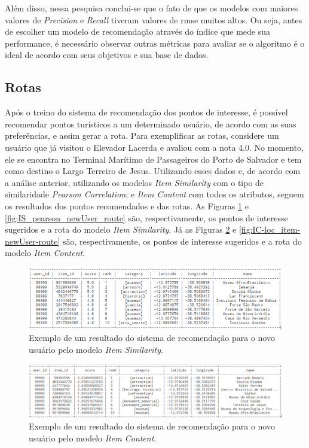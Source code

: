 Além disso, nessa pesquisa conclui-se que o fato de que os modelos com maiores valores de \textit{Precision} e \textit{Recall} tiveram valores de \ac{rmse} muitos altos. Ou seja, antes de escolher um modelo de recomendação através do índice que mede sua performance, é necessário observar outras métricas para avaliar se o algoritmo é o ideal de acordo com seus objetivos e sua base de dados.

\subsection{Rotas}

Após o treino do sistema de recomendação dos pontos de interesse, é possível recomendar pontos turísticos a um determinado usuário, de acordo com as suas preferências, e assim gerar a rota. Para exemplificar as rotas, considere um usuário que já visitou o Elevador Lacerda e avaliou com a nota 4.0. No momento, ele se encontra no Terminal Marítimo de Passageiros do Porto de Salvador e tem como destino o Largo Terreiro de Jesus. Utilizando esses dados e, de acordo com a análise anterior, utilizando os modelos \textit{Item Similarity} com o tipo de similaridade \textit{Pearson Correlation}; e \textit{Item Content} com todos os atributos, seguem os resultados dos pontos recomendados e das rotas. As Figuras \ref{fig:IS_pearson_newUser_results_rotate} e \ref{fig:IS_pearson_newUser_route} são, respectivamente, os pontos de interesse sugeridos e a rota do modelo \textit{Item Similarity}. Já as Figuras \ref{fig:IC-loc_item-newUser-results_rotate} e \ref{fig:IC-loc_item-newUser-route} são, respectivamente, os pontos de interesse sugeridos e a rota do modelo \textit{Item Content}.

\begin{figure}
    \centering
    \includegraphics[scale=0.95]{images/IS_pearson_newUser_results.png}
    \caption{Exemplo de um resultado do sistema de recomendação para o novo usuário pelo modelo \textit{Item Similarity}.}
    \label{fig:IS_pearson_newUser_results_rotate}
\end{figure}

\begin{figure}
    \centering
    \includegraphics[scale=0.85]{images/IC-loc_item-newUser-results.png}
    \caption{Exemplo de um resultado do sistema de recomendação para o novo usuário pelo modelo \textit{Item Content}.}
    \label{fig:IC-loc_item-newUser-results_rotate}
\end{figure}

